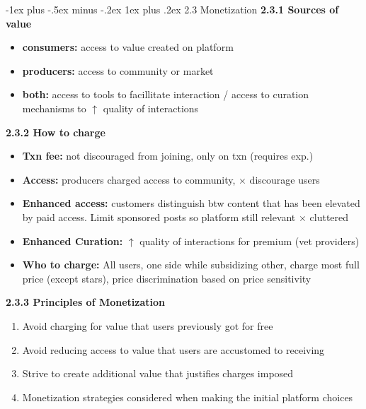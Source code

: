\documentclass[10pt,landscape]{article}
\makeatletter
\newcommand{\subsubsubsection}{\@startsection{subsubsection}{3}{0mm}%
                                {-1ex plus -.5ex minus -.2ex}%
                                {1ex plus .2ex}%
                                {\normalfont\scriptsize\bfseries}}
\makeatother
\begin{document}
\begin{multicols*}{3}
\subsubsubsection{2.3 Monetization}
\textbf{2.3.1 Sources of value}
\begin{itemize}[topsep=0pt,noitemsep,wide=0pt, leftmargin=\dimexpr{} + 2\relax]
    \item \textbf{consumers:} access to value created on platform
    \item \textbf{producers:} access to community or market
    \item \textbf{both:} access to tools to facillitate interaction / access to curation mechanisms to $\uparrow$ quality of interactions
\end{itemize}
\textbf{2.3.2 How to charge}
\begin{itemize}[topsep=0pt,noitemsep,wide=0pt, leftmargin=\dimexpr{} + 2\relax]
    \item \textbf{Txn fee:} not discouraged from joining, only on txn (requires exp.)
    \item \textbf{Access:} producers charged access to community, $\times$ discourage users
    \item \textbf{Enhanced access:} customers distinguish btw content that has been elevated by paid access. Limit sponsored posts so platform still relevant $\times$ cluttered
    \item \textbf{Enhanced Curation:} $\uparrow$ quality of interactions for premium (vet providers)
    \item \textbf{Who to charge:} All users, one side while subsidizing other, charge most full price (except stars), price discrimination based on price sensitivity
\end{itemize}
\textbf{2.3.3 Principles of Monetization}
\begin{enumerate}[topsep=0pt,noitemsep,wide=0pt, leftmargin=\dimexpr\labelwidth + 2\labelsep\relax]
    \item Avoid charging for value that users previously got for free
    \item Avoid reducing access to value that users are accustomed to receiving
    \item Strive to create additional value that justifies charges imposed
    \item Monetization strategies considered when making the initial platform choices
\end{enumerate}


\end{multicols*}
\end{document}
